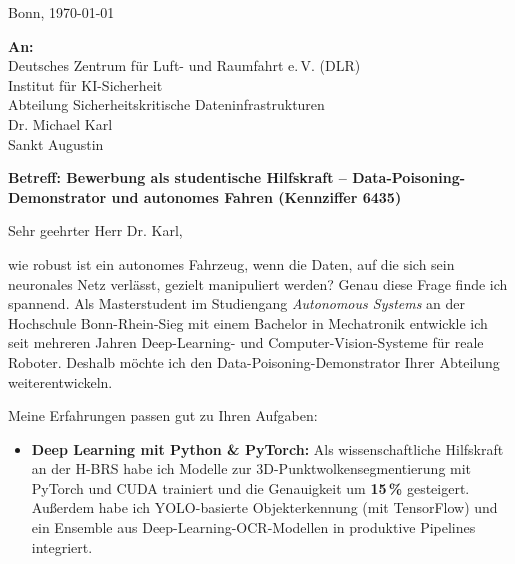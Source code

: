 \documentclass[a4paper,10pt]{article}
\begin{document}
\vspace{12pt}
\hspace{0.015\textwidth}
\begin{minipage}{0.97\textwidth}

\hfill Bonn, \today
\vspace{4pt}

\textbf{An:} \\
Deutsches Zentrum für Luft- und Raumfahrt e.\,V. (DLR) \\
Institut für KI-Sicherheit \\
Abteilung Sicherheitskritische Dateninfrastrukturen \\
Dr. Michael Karl \\
Sankt Augustin \\

\vspace{5pt}

\textbf{Betreff: Bewerbung als studentische Hilfskraft -- Data-Poisoning-Demonstrator und autonomes Fahren (Kennziffer 6435)}

\vspace{5pt}

Sehr geehrter Herr Dr. Karl,

\vspace{3pt}

wie robust ist ein autonomes Fahrzeug, wenn die Daten, auf die sich sein neuronales Netz verlässt, gezielt manipuliert werden? Genau diese Frage finde ich spannend. Als Masterstudent im Studiengang \textit{Autonomous Systems} an der Hochschule Bonn-Rhein-Sieg mit einem Bachelor in Mechatronik entwickle ich seit mehreren Jahren Deep-Learning- und Computer-Vision-Systeme für reale Roboter. Deshalb möchte ich den Data-Poisoning-Demonstrator Ihrer Abteilung weiterentwickeln.

\vspace{3pt}

Meine Erfahrungen passen gut zu Ihren Aufgaben:

\vspace{2pt}

\begin{itemize}[leftmargin=*, itemsep=2.5pt, topsep=2pt]

    \item \textbf{Deep Learning mit Python \& PyTorch:} Als wissenschaftliche Hilfskraft an der H-BRS habe ich Modelle zur 3D-Punktwolkensegmentierung mit PyTorch und CUDA trainiert und die Genauigkeit um \textbf{15\,\%} gesteigert. Außerdem habe ich YOLO-basierte Objekterkennung (mit TensorFlow) und ein Ensemble aus Deep-Learning-OCR-Modellen in produktive Pipelines integriert.


\end{itemize}
\end{minipage}
\end{document}

